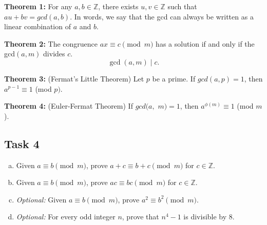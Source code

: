 \documentclass[12pt,letterpaper]{article}
\newcommand\Z{\mathbb Z}
\begin{document}
\textbf{Theorem 1:} For any $a,b \in \Z$, there exists $u,v \in \Z$ such that $au + bv = gcd(a,b)$. In words, we say that the gcd can always be written as a linear combination of $a$ and $b$.

\textbf{Theorem 2:} The congruence $ax \equiv c \pmod{m}$ has a solution if and only if the gcd$(a,m)$ divides $c$. 
\[
\gcd(a,m) \mid c.
\]

\textbf{Theorem 3:} (Fermat’s Little Theorem) Let $p$ be a prime. If $gcd(a, p) = 1$, then $a^{p-1} \equiv 1$ (mod $p)$.

\textbf{Theorem 4:} (Euler-Fermat Theorem) If $gcd(a,$ $m) = 1$, then $a^{\phi(m)} \equiv 1$ (mod $m$).

\pagebreak
	\subsection*{Task 4}

	\begin{enumerate}[a.]
		\item Given $a \equiv b \pmod{m}$, prove $a + c\equiv b + c\pmod{m}$ for $c \in \mathbb{Z}$.

		\begin{mdframed} \vspace{3cm} \end{mdframed}


		\item Given $a \equiv b \pmod{m}$, prove $ac\equiv bc\pmod{m}$ for $c \in \mathbb{Z}$.

		\begin{mdframed} \vspace{3cm} \end{mdframed}


		\item \textit{Optional: }Given $a \equiv b \pmod{m}$, prove $a^2\equiv b^2\pmod{m}$.

	\begin{mdframed} \vspace{3cm} \end{mdframed}


		\item \textit{Optional: }For every odd integer $n$, prove that $n^4 -1$ is divisible by 8.
		
		\begin{mdframed} \vspace{3cm} \end{mdframed}
	\end{enumerate}
	
\end{document}
